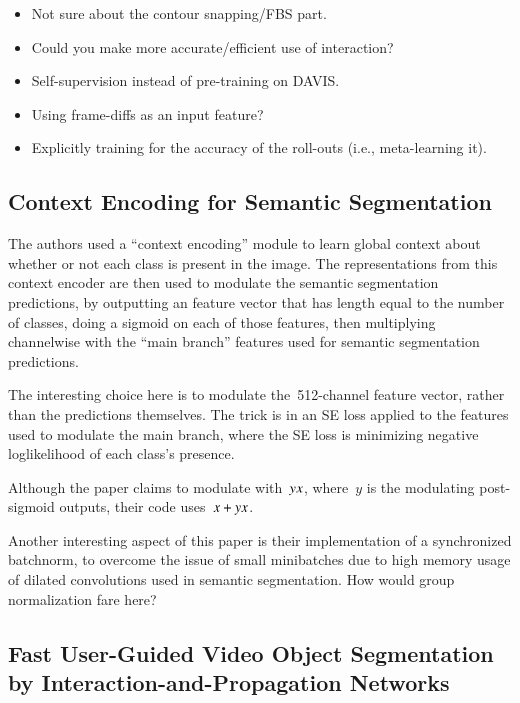 \documentclass[a4paper, 12pt]{article}
\begin{document}
\begin{itemize}
        \item Not sure about the contour snapping/FBS part.

        \item Could you make more accurate/efficient use of interaction?

        \item Self-supervision instead of pre-training on DAVIS\@.

        \item Using frame-diffs as an input feature?

        \item Explicitly training for the accuracy of the roll-outs (i.e.,
                meta-learning it).
\end{itemize}


\subsection{Context Encoding for Semantic Segmentation~\cite{Zhang_2018_CVPR}}

The authors used a ``context encoding'' module to learn global context about
whether or not each class is present in the image. The representations from
this context encoder are then used to modulate the semantic segmentation
predictions, by outputting an feature vector that has length equal to the
number of classes, doing a sigmoid on each of those features, then multiplying
channelwise with the ``main branch'' features used for semantic segmentation
predictions.

The interesting choice here is to modulate the~\num{512}-channel feature
vector, rather than the predictions themselves. The trick is in an SE loss
applied to the features used to modulate the main branch, where the SE loss is
minimizing negative loglikelihood of each class's presence.

Although the paper claims to modulate with~$y \* x$, where~$y$ is the
modulating post-sigmoid outputs, their code uses~$x + y \* x$.

Another interesting aspect of this paper is their implementation of a
synchronized batchnorm, to overcome the issue of small minibatches due to high
memory usage of dilated convolutions used in semantic segmentation. How would
group normalization fare here?


\subsection{Fast User-Guided Video Object Segmentation by
            Interaction-and-Propagation Networks~\cite{oh2019fast}}
\end{document}

